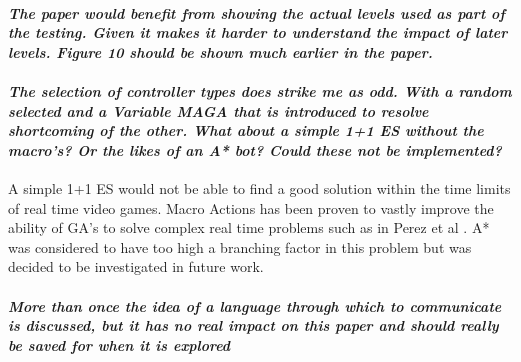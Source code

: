 \documentclass{article}
\begin{document}
\paragraph*{\textit{The paper would benefit from showing the actual levels used as part of the testing.  Given it makes it harder to understand the impact of later levels.  Figure 10 should be shown much earlier in the paper.}}
\paragraph*{\textit{The selection of controller types does strike me as odd.  With a random selected and a Variable MAGA that is introduced to resolve shortcoming of the other.  What about a simple 1+1 ES without the macro's?  Or the likes of an A* bot?  Could these not be implemented?}}
A simple 1+1 ES would not be able to find a good solution within the time limits of real time video games. Macro Actions has been proven to vastly improve the ability of GA's to solve complex real time problems such as in Perez et al \cite{perez2013rolling}. A* was considered to have too high a branching factor in this problem but was decided to be investigated in future work.
\paragraph*{\textit{More than once the idea of a language through which to communicate is discussed, but it has no real impact on this paper and should really be saved for when it is explored}}



\end{document}
